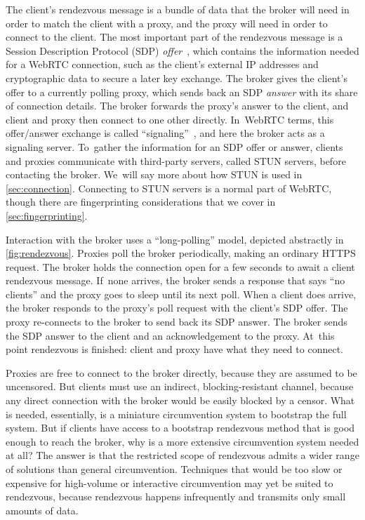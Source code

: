 \documentclass[letterpaper,twocolumn]{article}
\newcommand{\firstterm}[1]{\textit{#1}}
\begin{document}
The client's rendezvous message
is a bundle of data that the broker will need in order to match the client with a proxy,
and the proxy will need in order to connect to the client.
The most important part of the rendezvous message is a
Session Description Protocol (SDP) \firstterm{offer}~\cite{rfc8839},
which contains the information needed for a WebRTC connection,
such as the client's external IP addresses
and cryptographic data to secure a later key exchange.
The broker gives the client's offer to a currently polling proxy,
which sends back an SDP \firstterm{answer}
with its share of connection details.
The broker forwards the proxy's answer to the client,
and client and proxy then connect to one other directly.
In~WebRTC terms, this offer/\allowbreak answer exchange is called
``signaling''~\cite[\S 2.2]{rfc8825}, and here the broker acts as a signaling server.
To~gather the information for an SDP offer or answer,
clients and proxies communicate with third-party servers,
called STUN servers,
before contacting the broker.
We~will say more about how STUN is used in \autoref{sec:connection}.
Connecting to STUN servers is a normal part of WebRTC,
though there are fingerprinting considerations
that we cover in \autoref{sec:fingerprinting}.

Interaction with the broker uses a ``long-polling'' model,
depicted abstractly in \autoref{fig:rendezvous}.
Proxies poll the broker periodically,
making an ordinary HTTPS request.
The broker holds the connection open for a few seconds
to await a client rendezvous message.
If~none arrives, the broker sends a response that says ``no clients''
and the proxy goes to sleep until its next poll.
When a client does arrive,
the broker responds to the proxy's poll request
with the client's SDP offer.
The proxy re-connects to the broker to send back its SDP answer.
The broker sends the SDP answer to the client
and an acknowledgement to the proxy.
At~this point rendezvous is finished:
client and proxy have what they need to connect.

Proxies are free to connect to the broker directly,
because they are assumed to be uncensored.
But clients must use an indirect,
blocking-resistant channel,
because any direct connection with the broker
would be easily blocked by a censor.
What is needed, essentially,
is a miniature circumvention system to
bootstrap the full system.
But if clients have access to a bootstrap rendezvous method
that is good enough to reach the broker,
why is a more extensive circumvention system needed at all?
The answer is that the restricted scope of rendezvous
admits a wider range of solutions than general circumvention.
Techniques that would be too slow or expensive
for high-volume or interactive circumvention
may yet be suited to rendezvous,
because rendezvous happens infrequently
and transmits only small amounts of data.
\end{document}
